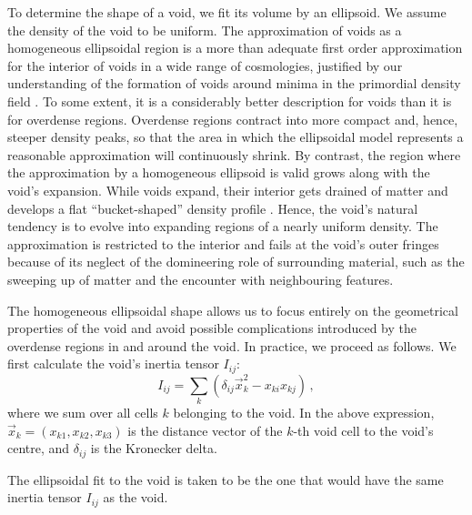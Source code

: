 To determine the shape of a void, we fit its volume by an ellipsoid. We assume the density of the void to be uniform.  
The approximation of voids as a homogeneous ellipsoidal region is a more than adequate first order approximation for the interior of 
voids in a wide range of cosmologies, justified by our understanding of the formation of voids around minima in the primordial 
density field \citep[e.g.][]{icke84,weygaert93,sheth04,shandarin06}. To some extent, it is a considerably better description 
for voids than it is for overdense regions. Overdense regions contract into more compact and, hence, steeper density peaks, 
so that the area in which the ellipsoidal model represents a reasonable approximation will continuously shrink. 
By contrast, the region where the approximation by a homogeneous ellipsoid is valid grows along with the void's expansion. 
While voids expand, their interior gets drained of matter and develops a flat ``bucket-shaped'' density profile \cite{weygaert93,sheth04}. 
Hence, the void's natural tendency is to evolve into expanding regions of a nearly uniform density. The approximation is restricted 
to the interior and fails at the void's outer fringes because of its neglect of the domineering role of surrounding material, 
such as the sweeping up of matter and the encounter with neighbouring features. 

The homogeneous ellipsoidal shape allows us to focus entirely on the geometrical properties of the void and avoid possible complications 
introduced by the overdense regions in and around the void. In practice, we proceed as follows. We first calculate the void's 
inertia tensor $I_{ij}$:
\begin{equation}
I_{ij} = \sum_k\left( \delta_{ij} \vec{x}_k^2 - x_{ki} x_{kj} \right) \,,
\end{equation}
where we sum over all cells $k$ belonging to the void. In the above expression, $\vec{x}_k=(x_{k1},x_{k2},x_{k3})$ is 
the distance vector of the $k$-th void cell to the void's centre, and $\delta_{ij}$ is the Kronecker delta. 

The ellipsoidal fit to the void is taken to be the one that would have the same inertia tensor $I_{ij}$ as the void. 

